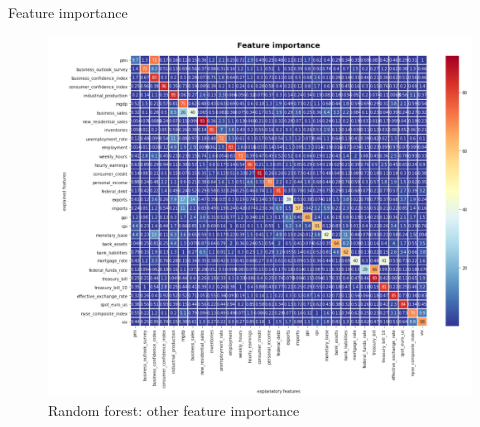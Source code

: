 \begin{frame}{Feature importance}
\begin{figure}[h]
	\centering
	\includegraphics[width=.7\linewidth]{im14}
	\caption{Random forest: other feature importance}
	\label{fig_app_7}
\end{figure}
\end{frame}






